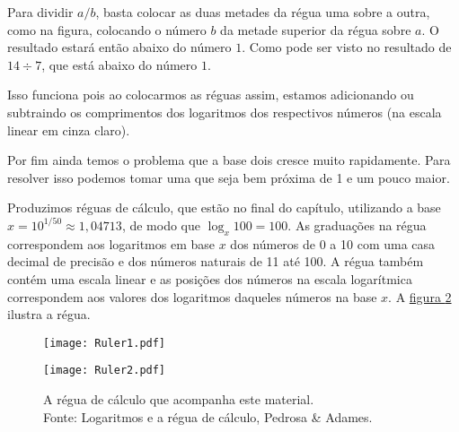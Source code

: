 \begin{figure}[H]

\label{Reguas}
\end{figure}


Para dividir $a / b$, basta colocar as duas metades da régua uma sobre a outra, como na figura, colocando o número $b$ da metade 
superior da régua sobre $a$. O resultado estará então abaixo do número $1$. Como pode ser visto no resultado de $14 \div 7$, que está abaixo do número $1$.

Isso funciona pois ao colocarmos as réguas assim, estamos adicionando ou  subtraindo os comprimentos dos logaritmos dos respectivos números (na escala linear em cinza claro).

Por fim ainda temos o problema que a base dois cresce muito rapidamente. Para resolver isso podemos tomar uma que seja bem próxima de 1 e um pouco maior.

Produzimos réguas de cálculo, que estão no final do capítulo, utilizando a base $x = 10^{1/50}\approx 1{,}04713$, de modo que $\log_{x}100=100$. As graduações na régua correspondem aos logaritmos em base $x$ dos números de 0 a 10 com uma casa decimal de precisão e dos números naturais de 11 até 100. A régua também contém uma escala linear e as posições dos números na escala logarítmica correspondem aos valores dos logaritmos daqueles números na base $x$. A \hyperref[ReguaCalculo]{figura \ref{ReguaCalculo}} ilustra a régua.

\begin{figure}[H]
\texttt{[image: Ruler1.pdf]}

\texttt{[image: Ruler2.pdf]}

\caption{A régua de cálculo que acompanha este material. \\ Fonte: Logaritmos e a régua de cálculo, Pedrosa \& Adames.}\label{ReguaCalculo}
\end{figure}


